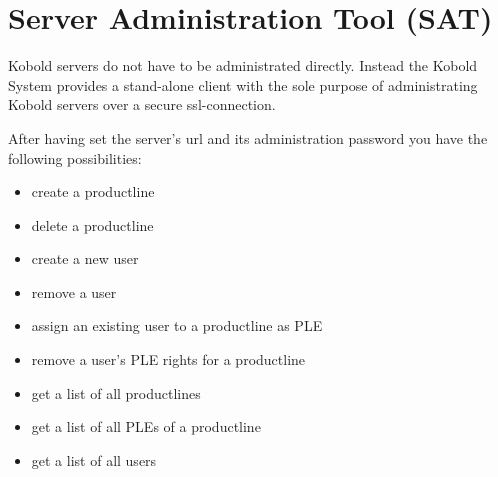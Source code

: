 \section{Server Administration Tool (SAT)}

Kobold servers do not have to be administrated directly. Instead the Kobold System 
provides a stand-alone client with the sole purpose of administrating Kobold servers 
over a secure ssl-connection. \par

After having set the server's url and its administration password you have the following 
possibilities:

\begin{itemize}
	\item create a productline
	\item delete a productline
	\item create a new user
	\item remove a user
	\item assign an existing user to a productline as PLE
	\item remove a user's PLE rights for a productline
	\item get a list of all productlines
	\item get a list of all PLEs of a productline
	\item get a list of all users
\end{itemize}

